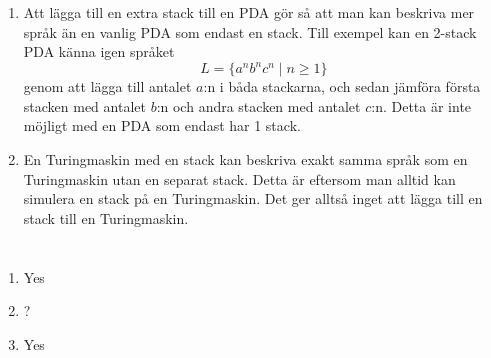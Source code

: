 \documentclass{article}
\begin{document}
\begin{enumerate}[label=(\alph*)]
    \item Att lägga till en extra stack till en PDA gör så att man kan beskriva mer språk än en vanlig PDA som endast en stack. Till exempel kan en 2-stack PDA känna igen språket 
    $$L = \{a^nb^nc^n \mid n \ge 1 \}$$
    genom att lägga till antalet $a$:n i båda stackarna, och sedan jämföra första stacken med antalet $b$:n och andra stacken med antalet $c$:n.
    Detta är inte möjligt med en PDA som endast har 1 stack.
    
    \item En Turingmaskin med en stack kan beskriva exakt samma språk som en Turingmaskin utan en separat stack. Detta är eftersom man alltid kan simulera en stack på en Turingmaskin. Det ger alltså inget att lägga till en stack till en Turingmaskin.
\end{enumerate}
\section{}

\begin{enumerate}[label=(\alph*)]
    \item Yes
    \item ?
    \item Yes


\end{enumerate}
\end{document}
